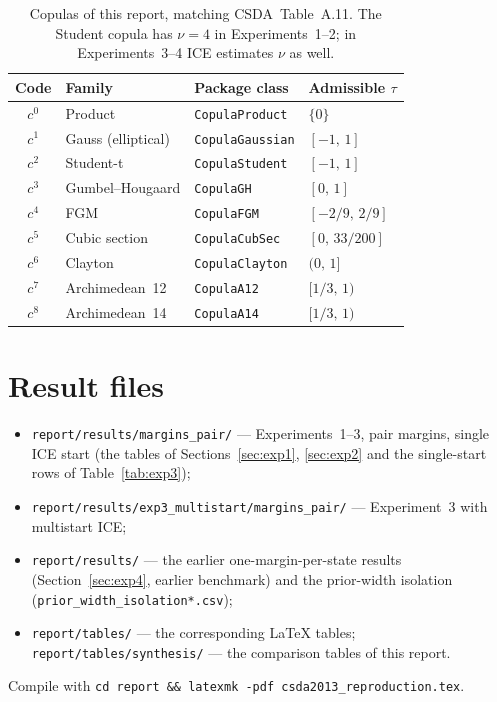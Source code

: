 \documentclass[11pt,a4paper]{article}
\begin{document}
\begin{table}[htbp]
  \centering
  \caption{Copulas of this report, matching CSDA~Table~A.11. The Student
           copula has $\nu=4$ in Experiments~1--2; in Experiments~3--4 ICE
           estimates $\nu$ as well.}
  \label{tab:copula-registry}
  \begin{tabular}{clll}
    \toprule
    Code & Family & Package class & Admissible $\tau$ \\
    \midrule
    $c^{0}$ & Product             & \texttt{CopulaProduct}  & $\{0\}$ \\
    $c^{1}$ & Gauss (elliptical)  & \texttt{CopulaGaussian} & $[-1,\,1]$ \\
    $c^{2}$ & Student-t           & \texttt{CopulaStudent}  & $[-1,\,1]$ \\
    $c^{3}$ & Gumbel--Hougaard    & \texttt{CopulaGH}       & $[0,\,1]$ \\
    $c^{4}$ & FGM                 & \texttt{CopulaFGM}      & $[-2/9,\,2/9]$ \\
    $c^{5}$ & Cubic section       & \texttt{CopulaCubSec}   & $[0,\,33/200]$ \\
    $c^{6}$ & Clayton             & \texttt{CopulaClayton}  & $(0,\,1]$ \\
    $c^{7}$ & Archimedean~12      & \texttt{CopulaA12}      & $[1/3,\,1)$ \\
    $c^{8}$ & Archimedean~14      & \texttt{CopulaA14}      & $[1/3,\,1)$ \\
    \bottomrule
  \end{tabular}
\end{table}

\section{Result files}\label{app:repro}

\begin{itemize}
  \item \texttt{report/results/margins\_pair/} --- Experiments~1--3, pair
        margins, single ICE start (the tables of Sections~\ref{sec:exp1},
        \ref{sec:exp2} and the single-start rows of
        Table~\ref{tab:exp3});
  \item \texttt{report/results/exp3\_multistart/margins\_pair/} ---
        Experiment~3 with multistart ICE;
  \item \texttt{report/results/} --- the earlier one-margin-per-state results
        (Section~\ref{sec:exp4}, earlier benchmark) and the prior-width
        isolation (\texttt{prior\_width\_isolation*.csv});
  \item \texttt{report/tables/} --- the corresponding \LaTeX{} tables;
        \texttt{report/tables/synthesis/} --- the comparison tables of this
        report.
\end{itemize}
Compile with \texttt{cd report \&\& latexmk -pdf csda2013\_reproduction.tex}.
\end{document}
